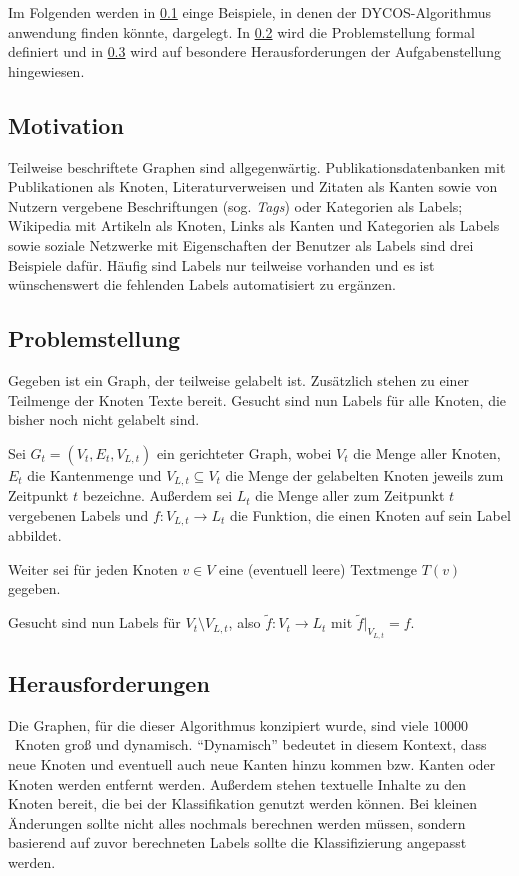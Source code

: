 Im Folgenden werden in \cref{sec:Motivation} einge Beispiele, in denen
der DYCOS-Algorithmus anwendung finden könnte, dargelegt. In
\cref{sec:Problemstellung} wird die Problemstellung formal definiert
und in \cref{sec:Herausforderungen} wird auf besondere Herausforderungen
der Aufgabenstellung hingewiesen.

\subsection{Motivation}\label{sec:Motivation}
Teilweise beschriftete Graphen sind allgegenwärtig. Publikationsdatenbanken
mit Publikationen als Knoten, Literaturverweisen und Zitaten als Kanten
sowie von Nutzern vergebene Beschriftungen (sog. {\it Tags}) oder Kategorien als Labels;
Wikipedia mit Artikeln als Knoten, Links als Kanten und Kategorien
als Labels sowie soziale Netzwerke mit Eigenschaften der Benutzer
als Labels sind drei Beispiele dafür.
Häufig sind Labels nur teilweise vorhanden und es ist wünschenswert die 
fehlenden Labels automatisiert zu ergänzen. 

\subsection{Problemstellung}\label{sec:Problemstellung}
Gegeben ist ein Graph, der teilweise gelabelt ist. Zusätzlich stehen
zu einer Teilmenge der Knoten Texte bereit. Gesucht sind nun Labels
für alle Knoten, die bisher noch nicht gelabelt sind.\\

\begin{definition}[Knotenklassifierungsproblem]\label{def:Knotenklassifizierungsproblem}
    Sei $G_t = (V_t, E_t, V_{L,t})$ ein gerichteter Graph,
    wobei $V_t$ die Menge aller Knoten,
    $E_t$ die Kantenmenge und $V_{L,t} \subseteq V_t$ die Menge der 
    gelabelten Knoten jeweils zum Zeitpunkt $t$ bezeichne.
    Außerdem sei $L_t$ die Menge aller zum Zeitpunkt $t$ vergebenen
    Labels und $f:V_{L,t} \rightarrow L_t$ die Funktion, die einen
    Knoten auf sein Label abbildet.

    Weiter sei für jeden Knoten $v \in V$ eine (eventuell leere)
    Textmenge $T(v)$ gegeben.

    Gesucht sind nun Labels für $V_t \setminus V_{L,t}$, also
    $\tilde{f}: V_t \rightarrow L_t$ mit 
    $\tilde{f}|_{V_{L,t}} = f$.
\end{definition}

\subsection{Herausforderungen}\label{sec:Herausforderungen}
Die Graphen, für die dieser Algorithmus konzipiert wurde,
sind viele $\num{10000}$~Knoten groß und dynamisch. \enquote{Dynamisch}
bedeutet in diesem Kontext, dass neue Knoten und eventuell auch neue 
Kanten hinzu kommen bzw. Kanten oder Knoten werden entfernt werden. 
Außerdem stehen textuelle Inhalte zu den 
Knoten bereit, die bei der Klassifikation genutzt werden können.
Bei kleinen Änderungen sollte nicht alles nochmals berechnen 
werden müssen, sondern basierend auf zuvor
berechneten Labels sollte die Klassifizierung angepasst werden.
